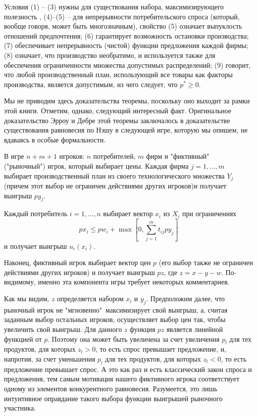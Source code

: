 Условия (1) -- (3) нужны для существования набора,
максимизирующего полезность , (4)--(5) -- для непрерывности
потребительского спроса (который, вообще говоря, может быть
многозначным), свойство (5) означает выпуклость отношений
предпочтения; (6) гарантирует возможность остановки производства;
(7) обеспечивает непрерывность (чистой) функции предложения каждой
фирмы; (8) означает, что производство необратимо, и используется
также для обеспечения ограниченности множества допустимых
распределений; (9) говорит, что любой производственный план,
использующий все товары как факторы производства, является
допустимым, из чего следует, что $p^*\ge 0$.

Мы не приводим здесь доказательства теоремы, поскольку оно выходит
за рамки этой книги. Отметим, однако, следующий интересный факт.
Оригинальное доказательство Эрроу и Дебре этой теоремы заключалось
в доказательстве существования равновесия по Нэшу в следующей
игре, которую мы опишем, не вдаваясь в особые формальности.

В игре $n+m+1$ игроков: $n$ потребителей, $m$ фирм и "фиктивный"\,
("рыночный") игрок, который выбирает цены.
Каждая фирма $j=1,\ldots,m$ выбирает производственный план из своего
технологического множества $Y_j$ (причем этот выбор не ограничен действиями
других игроков)и получает выигрыш $py_j$.

Каждый потребитель $i=1,\ldots,n$  выбирает вектор $x_i$ из $X_i$
при ограничениях
$$px_i \leq pw_i+\max[0,\sum^m_{j=1}t_{ij}py_j]$$
и получает выигрыш $u_i(x_i)$.

Наконец, фиктивный игрок выбирает вектор цен $p$ (его выбор также не
ограничен действиями других игроков) и получает выигрыш $pz$, где
$z=x-y-w$. По-видимому, именно эта компонента игры требует некоторых комментариев.

Как мы видим, $z$ определяется набором $x_i$ и $y_j$. Предположим далее,
что рыночный игрок не  "мгновенно"\, максимизирует свой  выигрыш, а,
считая заданным выбор остальных игроков, осуществляет выбор цен так,
чтобы увеличить свой выигрыш. Для данного $z$ функция $pz$ является линейной
функцией от $p$. Поэтому она может быть увеличена за счет увеличения
$p_l$ для тех продуктов, для которых $z_l>0$, то есть спрос превышает предложение,
и, напротив, за счет уменьшения $p_l$ для тех продуктов, для которых $z_l<0$,
то есть предложение превышает спрос. А это как раз и есть классический
закон спроса и предложения, тем самым мотивация нашего фиктивного игрока
соответствует одному из элементов конкурентного равновесия. Разумеется, это
лишь интуитивное оправдание такого выбора функции выигрышей рыночного
участника.

